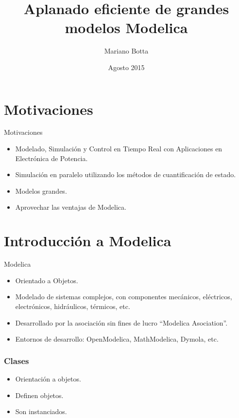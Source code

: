 \documentclass[aspectratio=169,10pt]{beamer}
\title{Aplanado eficiente de grandes modelos Modelica}
\author[M.Botta] {Mariano Botta }
\institute[UNR] %
{ FCEIA, UNR }
\date {Agosto 2015}
\begin{document}
\begin{frame}
  \titlepage
\end{frame}

 
\section{Motivaciones}  

\begin{frame}{Motivaciones}
    \begin{itemize}
     \item Modelado, Simulaci\'on y Control en Tiempo Real con Aplicaciones en Electr\'onica de Potencia.
     \item Simulaci\'on en paralelo utilizando los m\'etodos de cuantificaci\'on de estado.  
     \item Modelos grandes.
     \item Aprovechar las ventajas de Modelica.
    \end{itemize}
\end{frame}

\section{Introducci\'on a Modelica}



\begin{frame}{Modelica} 
    \begin{itemize}
        \item Orientado a Objetos.
        \item Modelado de sistemas complejos, con componentes mec\'anicos, el\'ectricos, electr\'onicos, hidr\'aulicos, t\'ermicos, etc.     
        \item Desarrollado por la asociaci\'on sin fines de lucro ``Modelica Asociation''.
        \item Entornos de desarrollo: OpenModelica, MathModelica, Dymola, etc.
    \end{itemize}
\end{frame}
 

\begin{frame}[fragile]
\frametitle{Clases} 
\begin{itemize}
	\item Orientaci\'on a objetos.
	\item Definen objetos.
	\item Son instanciados.
\end{itemize}
\end{frame}
\end{document}
